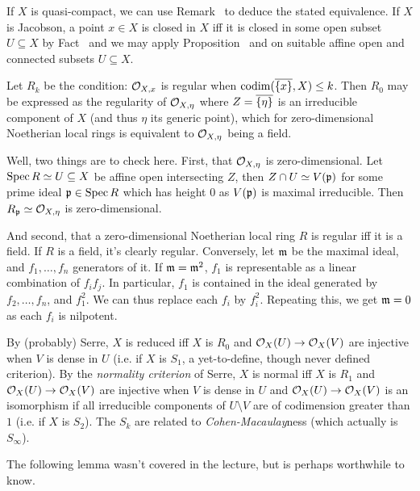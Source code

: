 \documentclass[a4paper,parskip=half,numbers=enddot, DIV=12]{scrreprt}
\begin{document}
\begin{rem*}
\begin{alphanumerate}
         If $X$ is quasi-compact, we can use Remark~ to deduce the stated equivalence. If $X$ is Jacobson, a point $x\in X$ is closed in $X$ iff it is closed in some open subset $U\subseteq X$ by Fact~ and we may apply Proposition~ and  on suitable affine open and connected subsets $U\subseteq X$.
    \item 
        Let $R_k$ be the condition: $\mathcal{O}_{X,x}$ is regular when $\operatorname{codim}(\overline{\{x\}}, X) \leq k$. Then $R_0$ may be expressed as the regularity of $\mathcal{O}_{X,\eta}$ where $Z=\overline{\left\{\eta\right\}}$ is an irreducible component of $X$ (and thus $\eta$ its generic point), which for zero-dimensional Noetherian local rings is equivalent to $\mathcal{O}_{X,\eta}$ being a field. 
        
        Well, two things are to check here. First, that $\mathcal{O}_{X,\eta}$ is zero-dimensional. Let $\operatorname{Spec} R\simeq U\subseteq X$ be affine open intersecting $Z$, then $Z\cap U\simeq V(\mathfrak{p})$ for some prime ideal $\mathfrak{p}\in\operatorname{Spec} R$ which has height $0$ as $V(\mathfrak{p})$ is maximal irreducible. Then $R_{\mathfrak{p}}\simeq \mathcal{O}_{X,\eta}$ is zero-dimensional.  
        
        And second, that a zero-dimensional Noetherian local ring $R$ is regular iff it is a field. If $R$ is a field, it's clearly regular. Conversely, let $\mathfrak{m}$ be the maximal ideal, and $f_1,\ldots,f_n$ generators of it. If $\mathfrak{m}=\mathfrak{m}^2$, $f_1$ is representable as a linear combination of $f_if_j$. In particular, $f_1$ is contained in the ideal generated by $f_2,\ldots,f_n$, and $f_1^2$. We can thus replace each $f_i$ by $f_i^2$. Repeating this, we get $\mathfrak{m}=0$ as each $f_i$ is nilpotent.
        
          By (probably) Serre, $X$ is reduced iff $X$ is $R_0$ and $\Oo_X(U)\morphism \Oo_X(V)$ are injective when $V$ is dense in $U$ (i.e. if $X$ is $S_1$, a yet-to-define, though never defined criterion). By the \emph{normality criterion} of Serre, $X$ is normal iff $X$ is $R_1$ and $\Oo_X(U)\morphism \Oo_X(V)$ are injective when $V$ is dense in $U$ and $\Oo_X(U)\morphism \Oo_X(V)$ is an isomorphism if all irreducible components of $U\setminus V$ are of codimension greater than $1$ (i.e. if $X$ is $S_2$). The $S_k$ are related  to \emph{Cohen-Macaulay}ness (which actually is $S_\infty$).
    \end{alphanumerate}
\end{rem*}
The following lemma wasn't covered in the lecture, but is perhaps worthwhile to know.
\end{document}
